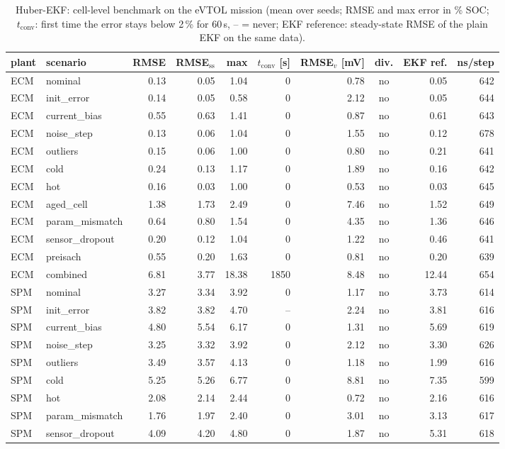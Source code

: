 \begin{table}[H]\centering\footnotesize\setlength{\tabcolsep}{4pt}
\caption{Huber-EKF: cell-level benchmark on the eVTOL mission (mean over seeds; RMSE and max error in \% SOC; $t_\mathrm{conv}$: first time the error stays below 2\,\% for 60\,s, -- = never; EKF reference: steady-state RMSE of the plain EKF on the same data).}\label{tab:cell_HuberEKF}
\begin{tabular}{llrrrrrcrr}\toprule
plant & scenario & RMSE & RMSE$_\mathrm{ss}$ & max & $t_\mathrm{conv}$ [s] & RMSE$_v$ [mV] & div. & EKF ref. & ns/step \\ \midrule
ECM & nominal & 0.13 & 0.05 & 1.04 & 0 & 0.78 & no & 0.05 & 642 \\
ECM & init\_error & 0.14 & 0.05 & 0.58 & 0 & 2.12 & no & 0.05 & 644 \\
ECM & current\_bias & 0.55 & 0.63 & 1.41 & 0 & 0.87 & no & 0.61 & 643 \\
ECM & noise\_step & 0.13 & 0.06 & 1.04 & 0 & 1.55 & no & 0.12 & 678 \\
ECM & outliers & 0.15 & 0.06 & 1.00 & 0 & 0.80 & no & 0.21 & 641 \\
ECM & cold & 0.24 & 0.13 & 1.17 & 0 & 1.89 & no & 0.16 & 642 \\
ECM & hot & 0.16 & 0.03 & 1.00 & 0 & 0.53 & no & 0.03 & 645 \\
ECM & aged\_cell & 1.38 & 1.73 & 2.49 & 0 & 7.46 & no & 1.52 & 649 \\
ECM & param\_mismatch & 0.64 & 0.80 & 1.54 & 0 & 4.35 & no & 1.36 & 646 \\
ECM & sensor\_dropout & 0.20 & 0.12 & 1.04 & 0 & 1.22 & no & 0.46 & 641 \\
ECM & preisach & 0.55 & 0.20 & 1.63 & 0 & 0.81 & no & 0.20 & 639 \\
ECM & combined & 6.81 & 3.77 & 18.38 & 1850 & 8.48 & no & 12.44 & 654 \\
\midrule
SPM & nominal & 3.27 & 3.34 & 3.92 & 0 & 1.17 & no & 3.73 & 614 \\
SPM & init\_error & 3.82 & 3.82 & 4.70 & -- & 2.24 & no & 3.81 & 616 \\
SPM & current\_bias & 4.80 & 5.54 & 6.17 & 0 & 1.31 & no & 5.69 & 619 \\
SPM & noise\_step & 3.25 & 3.32 & 3.92 & 0 & 2.12 & no & 3.30 & 626 \\
SPM & outliers & 3.49 & 3.57 & 4.13 & 0 & 1.18 & no & 1.99 & 616 \\
SPM & cold & 5.25 & 5.26 & 6.77 & 0 & 8.81 & no & 7.35 & 599 \\
SPM & hot & 2.08 & 2.14 & 2.44 & 0 & 0.72 & no & 2.16 & 616 \\
SPM & param\_mismatch & 1.76 & 1.97 & 2.40 & 0 & 3.01 & no & 3.13 & 617 \\
SPM & sensor\_dropout & 4.09 & 4.20 & 4.80 & 0 & 1.87 & no & 5.31 & 618 \\
\bottomrule\end{tabular}\end{table}
